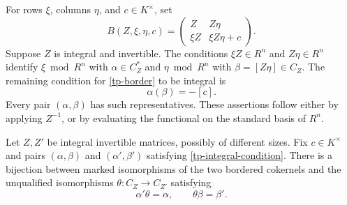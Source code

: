 For rows $\xi$, columns $\eta$, and $c\in K^\times$, set
\begin{equation}\label{tp-border}
 B(Z,\xi,\eta,c)=
 \begin{pmatrix}Z&Z\eta\\ \xi Z&\xi Z\eta+c\end{pmatrix}.
\end{equation}
Suppose $Z$ is integral and invertible. The conditions
$\xi Z\in R^n$ and $Z\eta\in R^n$ identify $\xi\bmod R^n$
with $\alpha\in C_Z^*$ and $\eta\bmod R^n$ with
$\beta=[Z\eta]\in C_Z$. The remaining condition for
\eqref{tp-border} to be integral is
\begin{equation}\label{tp-integral-condition}
                         \alpha(\beta)=-[c].
\end{equation}
Every pair $(\alpha,\beta)$ has such representatives. These
assertions follow either by applying $Z^{-1}$, or by evaluating
the functional on the standard basis of $R^n$.

\begin{lemma}\label{tp-border-isomorphisms}
Let $Z,Z'$ be integral invertible matrices, possibly of different
sizes. Fix $c\in K^\times$ and pairs $(\alpha,\beta)$ and
$(\alpha',\beta')$ satisfying \eqref{tp-integral-condition}.
There is a bijection between marked isomorphisms of the two
bordered cokernels and the unqualified isomorphisms
$\theta:C_Z\to C_{Z'}$ satisfying
\[
                 \alpha'\theta=\alpha,\qquad
                 \theta\beta=\beta'.
\]
\end{lemma}

